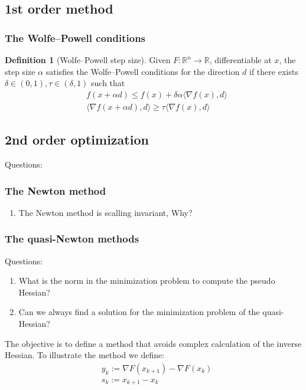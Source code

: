 \documentclass[a4paper,11pt,fleqn, draft]{book}
\theoremstyle{definition}
\newtheorem{definition}{Definition}[section]
\theoremstyle{remark}
\newcommand{\R}{\mathbb{R}}
\newcommand{\Rn}{\mathbb{R}^n}
\begin{document}
\subsection{1st order method}

\subsubsection{The Wolfe--Powell conditions}
\begin{definition}[Wolfe--Powell step size]
	Given $F: \Rn \rightarrow \R$, differentiable at $x$, the step size $\alpha$ satisfies the Wolfe--Powell conditions for the direction $d$ if there exists $\delta \in (0, 1), \tau \in (\delta, 1)$ such that 
	\begin{align*}
		& f( x + \alpha d ) \le f(x) + \delta \alpha \langle \nabla f(x), d \rangle\\
		& \langle \nabla f(x + \alpha d), d \rangle \ge \tau \langle \nabla f(x), d\rangle
	\end{align*}
\end{definition}


\subsection{2nd order optimization}
Questions: 
\subsubsection{The Newton method}
\begin{enumerate}
	\item The Newton method is scalling invariant, Why?
\end{enumerate}


\subsubsection{The quasi-Newton methods}
Questions: 
\begin{enumerate}
	\item What is the norm in the minimization problem to compute the pseudo Hessian?
	\item Can we always find a solution for the minimization problem of the quasi-Hessian?
\end{enumerate}
The objective is to define a method that avoids complex calculation of the inverse Hessian. To illustrate the method we define:
\begin{align*}
	&y_k:= \nabla F(x_{k + 1}) - \nabla F(x_k)\\
	&s_k:= x_{k + 1} - x_k
\end{align*}
\end{document}
